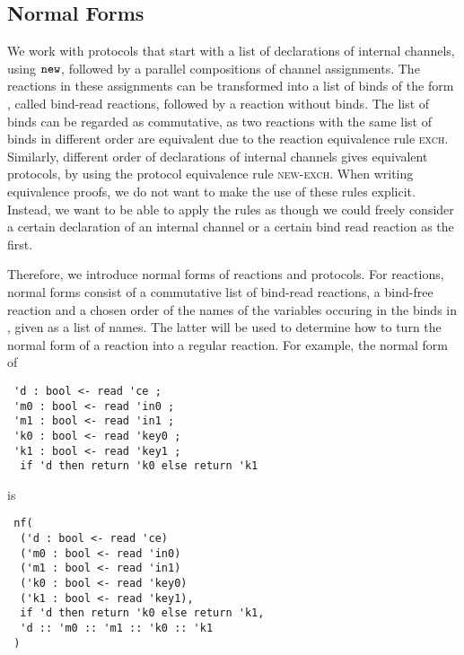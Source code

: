 \subsection{Normal Forms}

We work with protocols that start with a list of declarations of 
internal channels, using $\texttt{new}$, followed by a parallel compositions of channel assignments. The reactions in these
assignments can be transformed into a list of binds of the form
,
called bind-read reactions, followed by a reaction without binds.
The list of binds can be regarded as commutative, 
as two reactions with the same list of binds in different order
are equivalent due to the reaction equivalence rule \textsc{exch}.
Similarly, different order of declarations of internal channels gives
equivalent protocols, by using the protocol equivalence rule
\textsc{new-exch}. When writing equivalence proofs, we do not want to 
make the use of these rules explicit. Instead, we want to be able to apply
the rules as though we could freely consider a certain declaration of an 
internal channel or a certain bind read reaction as the first.

Therefore, we introduce normal forms of reactions and protocols. 
For reactions, normal forms 
consist of a commutative list  of bind-read reactions,
a bind-free reaction 
and a chosen order  of the names of the variables occuring in
the binds in , given as a list of names.
The latter will be used to determine how to turn the normal form 
of a reaction into a regular reaction.
For example, the normal form of
\begin{lstlisting}
 'd : bool <- read 'ce ;
 'm0 : bool <- read 'in0 ; 
 'm1 : bool <- read 'in1 ;
 'k0 : bool <- read 'key0 ;
 'k1 : bool <- read 'key1 ;
  if 'd then return 'k0 else return 'k1
\end{lstlisting}
is
\begin{lstlisting}
 nf(
  ('d : bool <- read 'ce)
  ('m0 : bool <- read 'in0) 
  ('m1 : bool <- read 'in1)
  ('k0 : bool <- read 'key0)
  ('k1 : bool <- read 'key1),
  if 'd then return 'k0 else return 'k1,
  'd :: 'm0 :: 'm1 :: 'k0 :: 'k1
 )
\end{lstlisting}
 
